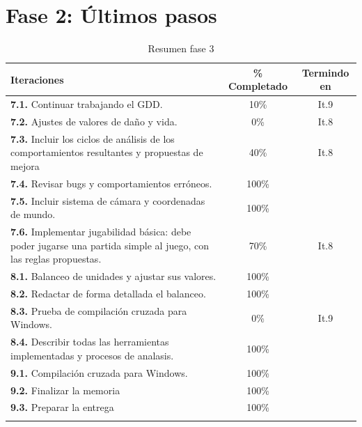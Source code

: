 \section{Fase 2: Últimos pasos}
\begin{longtable}[c]{|p{7cm}|c|c|}
\hline
Iteraciones                                                & \% Completado & Termindo en \\ 
\hline
\endhead
\textbf{7.1.} Continuar trabajando el GDD.                 & 10\% & It.9  \\
	\cmidrule[.003pt]{1-3}
\textbf{7.2.} Ajustes de valores de daño y vida.           &  0\% & It.8  \\ 
	\cmidrule[.003pt]{1-3}
\textbf{7.3.} Incluir los ciclos de análisis de los 
				comportamientos resultantes y 
				propuestas de mejora                       & 40\% & It.8  \\ 
	\cmidrule[.003pt]{1-3}
\textbf{7.4.} Revisar bugs y comportamientos erróneos.     & 100\% & \\
	\cmidrule[.003pt]{1-3}
\textbf{7.5.} Incluir sistema de cámara y coordenadas 
				de mundo.                                  & 100\% & \\
	\cmidrule[.003pt]{1-3}
\textbf{7.6.} Implementar jugabilidad básica: debe poder
				jugarse una partida simple al juego, con
				las reglas propuestas.                     & 70\% & It.8  \\

		\cmidrule[1pt]{1-3}

\textbf{8.1.} Balanceo de unidades y ajustar sus valores.  & 100\% &  \\
	\cmidrule[.003pt]{1-3}
\textbf{8.2.} Redactar de forma detallada el balanceo.     & 100\% &  \\
	\cmidrule[.003pt]{1-3}
\textbf{8.3.} Prueba de compilación cruzada para Windows.  & 0\% & It.9 \\
	\cmidrule[.003pt]{1-3}
\textbf{8.4.} Describir todas las herramientas implementadas
				y procesos de analasis.                    & 100\% &  \\
		
		\cmidrule[1pt]{1-3}

\textbf{9.1.} Compilación cruzada para Windows.  & 100\% &  \\
	\cmidrule[.003pt]{1-3}
\textbf{9.2.} Finalizar la memoria               & 100\% &  \\
	\cmidrule[.003pt]{1-3}
\textbf{9.3.} Preparar la entrega                & 100\% &  \\
\hline
\caption{Resumen fase 3}
\end{longtable}

